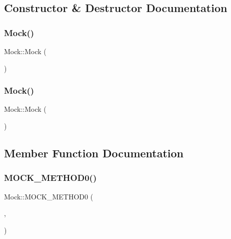 \subsection{Constructor \& Destructor Documentation}
\mbox{\label{classMock_a2b9528f2e7fcf9738201a5ea667c1998}} 
\subsubsection{\texorpdfstring{Mock()}{Mock()}\hspace{0.1cm}{\footnotesize\ttfamily [1/2]}}
{\footnotesize\ttfamily Mock\+::\+Mock (\begin{DoxyParamCaption}{ }\end{DoxyParamCaption})\hspace{0.3cm}{\ttfamily [inline]}}

\mbox{\label{classMock_a2b9528f2e7fcf9738201a5ea667c1998}} 
\subsubsection{\texorpdfstring{Mock()}{Mock()}\hspace{0.1cm}{\footnotesize\ttfamily [2/2]}}
{\footnotesize\ttfamily Mock\+::\+Mock (\begin{DoxyParamCaption}{ }\end{DoxyParamCaption})\hspace{0.3cm}{\ttfamily [inline]}}



\subsection{Member Function Documentation}
\mbox{\label{classMock_ae710f23cafb1a2f17772e8805d6312d2}} 
\subsubsection{\texorpdfstring{MOCK\_METHOD0()}{MOCK\_METHOD0()}}
{\footnotesize\ttfamily Mock\+::\+M\+O\+C\+K\+\_\+\+M\+E\+T\+H\+O\+D0 (\begin{DoxyParamCaption}\item[{Do\+This}]{,  }\item[{void()}]{ }\end{DoxyParamCaption})}

